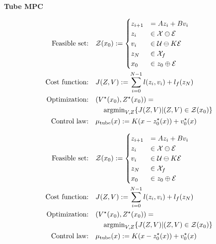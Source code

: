 \begin{sstTitleBox}[BrickRed]{\textbf{\large
			Tube MPC
		}
	}

	\[\begin{aligned}
			\text{Feasible set:}  & \quad
			\mathcal{Z}(x_0):=
			\begin{cases}
				z_{i+1} & = Az_i+Bv_i                         \\
				z_i     & \in \mathcal{X}\ominus\mathcal{E}   \\
				v_i     & \in \mathcal{U}\ominus K\mathcal{E} \\
				z_N     & \in \mathcal{X}_f                   \\
				x_0     & \in z_0\oplus\mathcal{E}            \\
			\end{cases}
			\\
			\text{Cost function:} & \quad
			J(Z,V):=\sum_{i=0}^{N-1}
			l(z_i,v_i)+l_f(z_N)
			\\
			\text{Optimization:}  & \quad
			(V^\star(x_0),Z^\star(x_0))=  \\
			                      &
			\quad\quad\operatorname{argmin}_{V,Z}\{J(Z,V)|(Z,V)\in\mathcal{Z}(x_0)\}
			\\
			\text{Control law:}   & \quad
			\mu_\text{tube}(x):=
			K(x-z_0^\star(x))+v_0^\star(x)
		\end{aligned}\]

	\begin{centering}
		\begin{sstOnlyFrame}[BrickRed]
			\vspace{-1.5mm}
			\[ \begin{aligned}
					\text{Feasible set:}  & \quad
					\mathcal{Z}(x_0):=
					\begin{cases}
						z_{i+1} & = Az_i+Bv_i                         \\
						z_i     & \in \mathcal{X}\ominus\mathcal{E}   \\
						v_i     & \in \mathcal{U}\ominus K\mathcal{E} \\
						z_N     & \in \mathcal{X}_f                   \\
						x_0     & \in z_0\oplus\mathcal{E}            \\
					\end{cases}
					\\
					\text{Cost function:} & \quad
					J(Z,V):=\sum_{i=0}^{N-1}
					l(z_i,v_i)+l_f(z_N)
					\\
					\text{Optimization:}  & \quad
					(V^\star(x_0),Z^\star(x_0))=  \\
					                      &
					\quad\quad\operatorname{argmin}_{V,Z}\{J(Z,V)|(Z,V)\in\mathcal{Z}(x_0)\}
					\\
					\text{Control law:}   & \quad
					\mu_\text{tube}(x):=
					K(x-z_0^\star(x))+v_0^\star(x)
				\end{aligned} \]
			\vspace{-2.5mm}
		\end{sstOnlyFrame}
	\end{centering}

\end{sstTitleBox}

